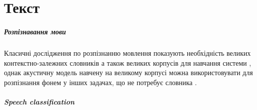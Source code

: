%	
%	
%	
%	
%	
%	
%	
%	
%	
%	

\chapter{Текст}

\paragraph{Розпізнавання мови}

Класичні дослідження по розпізнанню мовлення показують необхідність великих контекстно-залежних словників а також великих корпусів для навчання системи \cite{Pylypenko_2008,Pylypenko_2009,Pylypenko_2010,Lydovyk_2011,Vasilyeva_2012,Womack_1999,Zirneeva_2008,Gladunov_2005}, однак акустичну модель навчену на великому корпусі можна використовувати для розпізнання фонем у інших задачах, що не потребує словника \cite{Pylypenko_2008,Robeyko_2012,Abdel_2012,Zhang_2017,Sharma_2018,Yermolenko_2008}. 

\paragraph{Speech classification}

